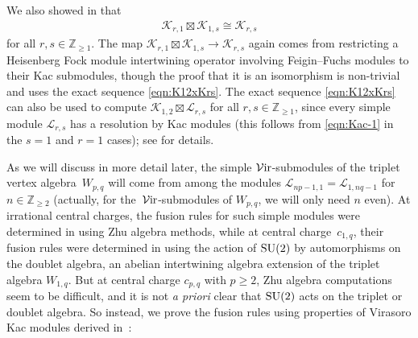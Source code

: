 \documentclass[pdftex]{sigma}
\numberwithin{equation}{section}
\theoremstyle{definition}
\begin{document}
 We also showed in \cite[Theorem 6.7]{MS-cpq-Vir} that
\begin{gather}\label{eqn:Kr1xK1s}
\mathcal{K}_{r,1}\boxtimes\mathcal{K}_{1,s}\cong\mathcal{K}_{r,s}
\end{gather}
for all $r,s\in\mathbb{Z}_{\geq 1}$. The map $\mathcal{K}_{r,1}\boxtimes\mathcal{K}_{1,s}\rightarrow\mathcal{K}_{r,s}$ again comes from restricting a Heisenberg Fock module intertwining operator involving Feigin--Fuchs modules to their Kac submodules, though the proof that it is an isomorphism is non-trivial and uses the exact sequence \eqref{eqn:K12xKrs}. The exact sequence \eqref{eqn:K12xKrs} can also be used to compute $\mathcal{K}_{1,2}\boxtimes\mathcal{L}_{r,s}$ for all $r,s\in\mathbb{Z}_{\geq 1}$, since every simple module $\mathcal{L}_{r,s}$ has a resolution by Kac modules (this follows from \eqref{eqn:Kac-1} in the $s=1$ and $r=1$ cases); see \cite[Theorem 6.8]{MS-cpq-Vir} for details.

As we will discuss in more detail later, the simple $\mathcal{V}{\rm ir}$-submodules of the triplet vertex algebra~$W_{p,q}$ will come from among the modules $\mathcal{L}_{np-1,1}=\mathcal{L}_{1,nq-1}$ for $n\in\mathbb{Z}_{\geq 2}$ (actually, for the~$\mathcal{V}{\rm ir}$-submodules of $W_{p,q}$, we will only need $n$ even). At irrational central charges, the fusion rules for such simple modules were determined in \cite{Frenkel-MZhu} using Zhu algebra methods, while at central charge~$c_{1,q}$, their fusion rules were determined in \cite{MY-cp1-Vir} using the action of ${\rm SU}(2)$ by automorphisms on the doublet algebra, an abelian intertwining algebra extension of the triplet algebra $W_{1,q}$. But at central charge $c_{p,q}$ with $p\geq 2$, Zhu algebra computations seem to be difficult, and it is not \textit{a priori} clear that ${\rm SU}(2)$ acts on the triplet or doublet algebra. So instead, we prove the fusion rules using properties of Virasoro Kac modules derived in~\cite{MS-cpq-Vir}:
\end{document}
